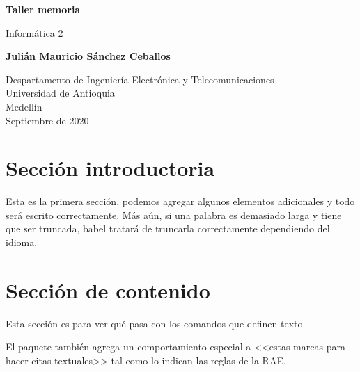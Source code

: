 \documentclass{article}
\begin{document}
\begin{titlepage}
    \begin{center}
        \vspace*{1cm}
            
        \Huge
        \textbf{Taller memoria}
            
        \vspace{0.5cm}
        \LARGE
        Informática 2
            
        \vspace{1.5cm}
            
        \textbf{Julián Mauricio Sánchez Ceballos}
            
        \vfill
            
        \vspace{0.8cm}
            
        \Large
        Despartamento de Ingeniería Electrónica y Telecomunicaciones\\
        Universidad de Antioquia\\
        Medellín\\
        Septiembre de 2020
            
    \end{center}
\end{titlepage}

\tableofcontents

\section{Sección introductoria}
Esta es la primera sección, podemos agregar algunos elementos adicionales y todo será escrito correctamente. Más aún, si una palabra es demasiado larga y tiene que ser truncada, babel tratará de truncarla correctamente dependiendo del idioma.

\section{Sección de contenido} \label{contenido}

Esta sección es para ver qué pasa con los comandos 
que definen texto

El paquete también agrega un comportamiento especial 
a <<estas marcas para hacer citas textuales>> tal como 
lo indican las reglas de la RAE. \cite{dirac}
\end{document}
